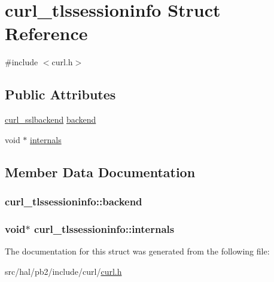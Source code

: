 \hypertarget{structcurl__tlssessioninfo}{}\section{curl\+\_\+tlssessioninfo Struct Reference}
\label{structcurl__tlssessioninfo}


{\ttfamily \#include $<$curl.\+h$>$}

\subsection*{Public Attributes}
\begin{DoxyCompactItemize}
\item 
\hyperlink{curl_8h_a908c5b707ac681212b8f8688cf76689d}{curl\+\_\+sslbackend} \hyperlink{structcurl__tlssessioninfo_a7ee41782ebe1a14c335dd2ff172bd3e1}{backend}
\item 
void $\ast$ \hyperlink{structcurl__tlssessioninfo_a9e81ab20dc7b96a491385baf471df847}{internals}
\end{DoxyCompactItemize}


\subsection{Member Data Documentation}
\subsubsection[{\texorpdfstring{backend}{backend}}]{ curl\+\_\+tlssessioninfo\+::backend}\hypertarget{structcurl__tlssessioninfo_a7ee41782ebe1a14c335dd2ff172bd3e1}{}\label{structcurl__tlssessioninfo_a7ee41782ebe1a14c335dd2ff172bd3e1}
\subsubsection[{\texorpdfstring{internals}{internals}}]{\setlength{\rightskip}{0pt plus 5cm}void$\ast$ curl\+\_\+tlssessioninfo\+::internals}\hypertarget{structcurl__tlssessioninfo_a9e81ab20dc7b96a491385baf471df847}{}\label{structcurl__tlssessioninfo_a9e81ab20dc7b96a491385baf471df847}


The documentation for this struct was generated from the following file\+:\begin{DoxyCompactItemize}
\item 
src/hal/pb2/include/curl/\hyperlink{curl_8h}{curl.\+h}\end{DoxyCompactItemize}
